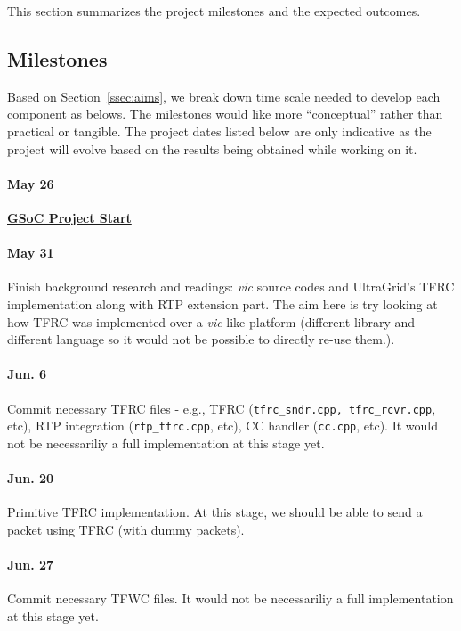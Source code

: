 
This section summarizes the project milestones and the expected outcomes.

\subsection{\label{ssec:plan}Milestones}

Based on Section~\ref{ssec:aims}, we break down time scale needed to develop
each component as belows. The milestones would like more ``conceptual'' rather
than practical or tangible. The project dates listed below are only indicative
as the project will evolve based on the results being obtained while working on
it.

\paragraph{\textsf{May 26}} \underline{\textbf{GSoC Project Start}}

\paragraph{\textsf{May 31}} Finish background research and readings: \emph{vic} source
codes and UltraGrid's TFRC implementation along with RTP extension part.  The
aim here is try looking at how TFRC was implemented over a \emph{vic}-like platform
(different library and different language so it would not be possible to
directly re-use them.).

\paragraph{\textsf{Jun. 6}} Commit necessary TFRC files - e.g., TFRC
(\texttt{tfrc\_sndr.cpp, tfrc\_rcvr.cpp}, etc), RTP integration
(\texttt{rtp\_tfrc.cpp}, etc), CC handler (\texttt{cc.cpp}, etc). It would not
be necessariliy a full implementation at this stage yet.

\paragraph{\textsf{Jun. 20}} Primitive TFRC implementation. At this stage, we
should be able to send a packet using TFRC (with dummy packets).

\paragraph{\textsf{Jun. 27}} Commit necessary TFWC files. It would not be
necessariliy a full implementation at this stage yet. 

